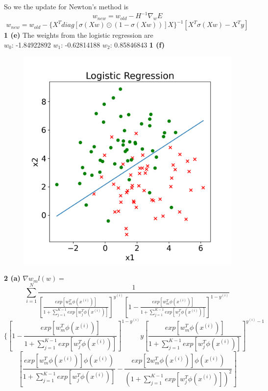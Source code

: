 \documentclass[12 pt]{article}        	%
\begin{document}
So we the update for Newton's method is
\[
  w_{new} = w_{old} - H^{-1} \nabla_w E 
\]
\[
  w_{new} = w_{old} - \{X^T diag[ \sigma(Xw) \odot (1 - \sigma(Xw)) ] X \}^{-1} [ X^T \sigma(Xw) - X^T y ]
\]
\textbf{1 (e)} The weights from the logistic regression are \\ 
$ w_0 $: -1.84922892 $ w_1 $: -0.62814188 $ w_2 $: 0.85846843
\newpage
\textbf{1 (f)}
\begin{figure}[h!]
  \includegraphics[width=\linewidth]{logistic_regression.png}
\end{figure}
\newpage
\textbf{2 (a)} $ \nabla w_m l (w) = $
\[ 
  \sum_{i=1}^{N} 
  \frac{1}{ 
    [\frac{exp[w_{m}^{T} \phi(x^{(i)})]}{1 + \sum_{j=1}^{K-1} exp[w_{j}^{T} \phi(x^{(i)})]} 
    ]^{y^{(i)}}
    [1 - 
      \frac{exp[w_{m}^{T} \phi(x^{(i)})]}{1 + \sum_{j=1}^{K-1} exp[w_{j}^{T} \phi(x^{(i)})]}
    ]^{1 - y^{(i)}}
  }
\]
\[
  \{
    [ 1 - \frac{exp[ w_{m}^{T} \phi(x^{(i)}) ]}{ 1 + \sum_{j=1}^{K-1} exp[ w_{j}^{T} \phi(x^{(i)}) ] } ]^{1 - y^{(i)}}
    y[ \frac{ exp[ w_{m}^{T} \phi(x^{(i)}) ] } { 1 + \sum_{j=1}^{K-1} exp[ w_{j}^{T} \phi(x^{(i)}) ] } ]^{y^{(i)}-1}
\]
\[
    [
      \frac{
        exp[ w_{m}^{T} \phi(x^{(i)}) ] \phi(x^{(i)})
      }{
        1 + \sum_{j=1}^{K-1} exp[ w_{j}^{T} \phi(x^{(i)}) ]
      }
      - \frac{
        exp[ 2 w_{m}^{T} \phi(x^{(i)}) ] \phi(x^{(i)})
      }{
        ( 1 + \sum_{j=1}^{K-1} exp[ w_{j}^{T} \phi(x^{(i)}) ] )^2
      }
    ]
\]
\end{document}
